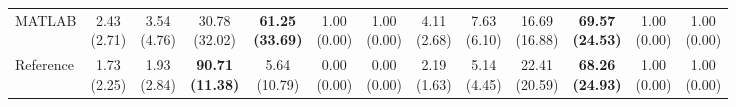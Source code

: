 {\begin{tabular}{l|cccccc|cccccc}
MATLAB & \makecell{2.43 \\ (2.71)} & \makecell{3.54 \\ (4.76)} & {\cellcolor[HTML]{C8E6C9}} \makecell{30.78 \\ (32.02)} & \bfseries \makecell{61.25 \\ (33.69)} & \makecell{1.00 \\ (0.00)} & \makecell{1.00 \\ (0.00)} & \makecell{4.11 \\ (2.68)} & \makecell{7.63 \\ (6.10)} & {\cellcolor[HTML]{C8E6C9}} \makecell{16.69 \\ (16.88)} & \bfseries \makecell{69.57 \\ (24.53)} & \makecell{1.00 \\ (0.00)} & \makecell{1.00 \\ (0.00)} \\
Reference & \makecell{1.73 \\ (2.25)} & \makecell{1.93 \\ (2.84)} & {\cellcolor[HTML]{C8E6C9}} \bfseries \makecell{90.71 \\ (11.38)} & \makecell{5.64 \\ (10.79)} & \makecell{0.00 \\ (0.00)} & \makecell{0.00 \\ (0.00)} & \makecell{2.19 \\ (1.63)} & \makecell{5.14 \\ (4.45)} & {\cellcolor[HTML]{C8E6C9}} \makecell{22.41 \\ (20.59)} & \bfseries \makecell{68.26 \\ (24.93)} & \makecell{1.00 \\ (0.00)} & \makecell{1.00 \\ (0.00)} \\
\bottomrule
\end{tabular}
}%
